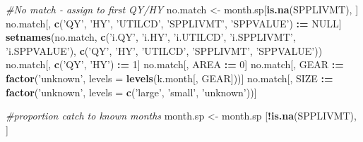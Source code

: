 \documentclass[]{article}
\newenvironment{Shaded}{\begin{snugshade}}{\end{snugshade}}
\newcommand{\KeywordTok}[1]{\textcolor[rgb]{0.13,0.29,0.53}{\textbf{#1}}}
\newcommand{\DataTypeTok}[1]{\textcolor[rgb]{0.13,0.29,0.53}{#1}}
\newcommand{\DecValTok}[1]{\textcolor[rgb]{0.00,0.00,0.81}{#1}}
\newcommand{\StringTok}[1]{\textcolor[rgb]{0.31,0.60,0.02}{#1}}
\newcommand{\CommentTok}[1]{\textcolor[rgb]{0.56,0.35,0.01}{\textit{#1}}}
\newcommand{\OtherTok}[1]{\textcolor[rgb]{0.56,0.35,0.01}{#1}}
\newcommand{\OperatorTok}[1]{\textcolor[rgb]{0.81,0.36,0.00}{\textbf{#1}}}
\newcommand{\ErrorTok}[1]{\textcolor[rgb]{0.64,0.00,0.00}{\textbf{#1}}}
\newcommand{\NormalTok}[1]{#1}
\begin{document}
\begin{Shaded}
\begin{Highlighting}[]
  \CommentTok{#No match - assign to first QY/HY}
\NormalTok{  no.match  <-}\StringTok{ }\NormalTok{month.sp[}\KeywordTok{is.na}\NormalTok{(SPPLIVMT), ]}
\NormalTok{  no.match[, }\KeywordTok{c}\NormalTok{(}\StringTok{'QY'}\NormalTok{, }\StringTok{'HY'}\NormalTok{, }\StringTok{'UTILCD'}\NormalTok{, }\StringTok{'SPPLIVMT'}\NormalTok{, }\StringTok{'SPPVALUE'}\NormalTok{) }\OperatorTok{:}\ErrorTok{=}\StringTok{ }\OtherTok{NULL}\NormalTok{]}
  \KeywordTok{setnames}\NormalTok{(no.match, }\KeywordTok{c}\NormalTok{(}\StringTok{'i.QY'}\NormalTok{, }\StringTok{'i.HY'}\NormalTok{, }\StringTok{'i.UTILCD'}\NormalTok{, }\StringTok{'i.SPPLIVMT'}\NormalTok{, }\StringTok{'i.SPPVALUE'}\NormalTok{), }
           \KeywordTok{c}\NormalTok{(}\StringTok{'QY'}\NormalTok{, }\StringTok{'HY'}\NormalTok{, }\StringTok{'UTILCD'}\NormalTok{, }\StringTok{'SPPLIVMT'}\NormalTok{, }\StringTok{'SPPVALUE'}\NormalTok{))}
\NormalTok{  no.match[, }\KeywordTok{c}\NormalTok{(}\StringTok{'QY'}\NormalTok{, }\StringTok{'HY'}\NormalTok{) }\OperatorTok{:}\ErrorTok{=}\StringTok{ }\DecValTok{1}\NormalTok{]}
\NormalTok{  no.match[, AREA }\OperatorTok{:}\ErrorTok{=}\StringTok{ }\DecValTok{0}\NormalTok{]}
\NormalTok{  no.match[, GEAR }\OperatorTok{:}\ErrorTok{=}\StringTok{ }\KeywordTok{factor}\NormalTok{(}\StringTok{'unknown'}\NormalTok{, }\DataTypeTok{levels =} \KeywordTok{levels}\NormalTok{(k.month[, GEAR]))]}
\NormalTok{  no.match[, SIZE }\OperatorTok{:}\ErrorTok{=}\StringTok{ }\KeywordTok{factor}\NormalTok{(}\StringTok{'unknown'}\NormalTok{, }\DataTypeTok{levels =} \KeywordTok{c}\NormalTok{(}\StringTok{'large'}\NormalTok{, }\StringTok{'small'}\NormalTok{, }\StringTok{'unknown'}\NormalTok{))]}
  
  \CommentTok{#proportion catch to known months}
\NormalTok{  month.sp   <-}\StringTok{ }\NormalTok{month.sp  [}\OperatorTok{!}\KeywordTok{is.na}\NormalTok{(SPPLIVMT), ]}
  

\end{Highlighting}
\end{Shaded}
\end{document}
